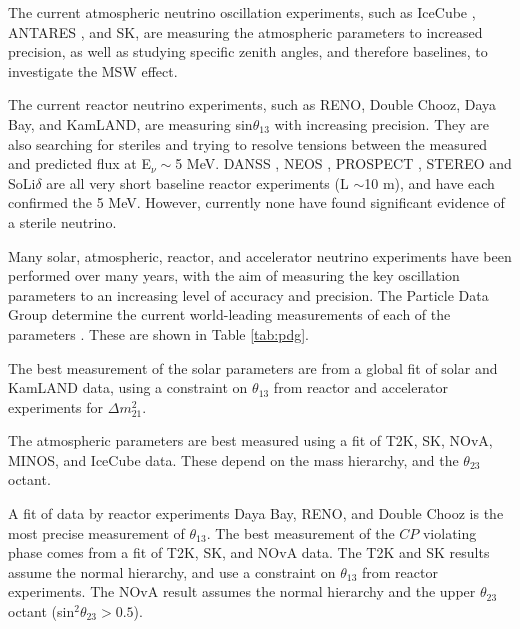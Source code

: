 The current atmospheric neutrino oscillation experiments, such as IceCube \cite{icecube}, ANTARES \cite{antares}, and SK, are measuring the atmospheric parameters to increased precision, as well as studying specific zenith angles, and therefore baselines, to investigate the MSW effect.

The current reactor neutrino experiments, such as RENO, Double Chooz, Daya Bay, and KamLAND, are measuring sin$\theta_{13}$ with increasing precision. They are also searching for steriles and trying to resolve tensions between the measured and predicted flux at E$_\nu\sim$5 MeV. DANSS \cite{danss}, NEOS \cite{neos}, PROSPECT \cite{prospect}, STEREO \cite{stereo} and SoLi$\delta$ \cite{solid} are all very short baseline reactor experiments (L $\sim$10 m), and have each confirmed the 5 MeV. However, currently none have found significant evidence of a sterile neutrino.

Many solar, atmospheric, reactor, and accelerator neutrino experiments have been performed over many years, with the aim of measuring the key oscillation parameters to an increasing level of accuracy and precision. The Particle Data Group determine the current world-leading measurements of each of the parameters \cite{pdg}. These are shown in Table \ref{tab:pdg}.

The best measurement of the solar parameters are from a global fit of solar and KamLAND data, using a constraint on $\theta_{13}$ from reactor and accelerator experiments for $\Delta m_{21}^2$. 

The atmospheric parameters are best measured using a fit of T2K, SK, NOvA, MINOS, and IceCube data. These depend on the mass hierarchy, and the $\theta_{23}$ octant.

A fit of data by reactor experiments Daya Bay, RENO, and Double Chooz is the most precise measurement of $\theta_{13}$. The best measurement of the $CP$ violating phase comes from a fit of T2K, SK, and NOvA data. The T2K and SK results assume the normal hierarchy, and use a constraint on $\theta_{13}$ from reactor experiments. The NOvA result assumes the normal hierarchy and the upper $\theta_{23}$ octant (sin$^2 \theta_{23} > 0.5$).

